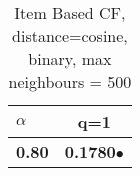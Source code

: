 \begin{table}
\begin{center}
\begin{tabular}{ | l || c |}
\hline
\textbf{$\alpha$} & \textbf{q=1} \\
\hline
\textbf{0.80} & \textbf{0.1780}$\bullet$\\
\hline
\end{tabular}
\caption{Item Based CF, distance=cosine, binary, max neighbours = 500}
\label{table:MAP_icf_cosine_binary_mnn=500}
\end{center}
\end{table}
